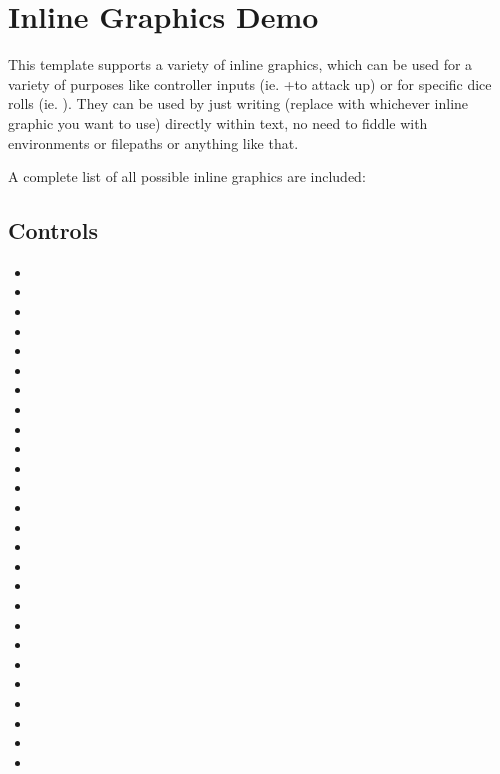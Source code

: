 \section{Inline Graphics Demo}

This template supports a variety of inline graphics, which can be used for a variety of purposes like controller inputs (ie. \controllerA+\controllerJoystickUp to attack up) or for specific dice rolls (ie. \diceSix\diceSix). They can be used by just writing \texttt{\controllerA} (replace with whichever inline graphic you want to use) directly within text, no need to fiddle with environments or filepaths or anything like that.

A complete list of all possible inline graphics are included:

\subsection{Controls}

\newcommand{\glyphdemo}[1]{#1 \hspace{1pt} \texttt{#1}}

\begin{itemize}
	\item \glyphdemo{\controllerA}
	\item \glyphdemo{\controllerB}
	\item \glyphdemo{\controllerX}
	\item \glyphdemo{\controllerY}
	\item \glyphdemo{\controllerDpad}
	\item \glyphdemo{\controllerDpadUp}
	\item \glyphdemo{\controllerDpadLeft}
	\item \glyphdemo{\controllerDpadDown}
	\item \glyphdemo{\controllerDpadRight}
	\item \glyphdemo{\controllerJoystick}
	\item \glyphdemo{\controllerJoystickUp}
	\item \glyphdemo{\controllerJoystickLeft}
	\item \glyphdemo{\controllerJoystickDown}
	\item \glyphdemo{\controllerJoystickRight}
	\item \glyphdemo{\controllerJoystickPress}
	\item \glyphdemo{\controllerL}
	\item \glyphdemo{\controllerLalt}
	\item \glyphdemo{\controllerR}
	\item \glyphdemo{\controllerRalt}
	\item \glyphdemo{\controllerZ}
	\item \glyphdemo{\controllerMouse}
	\item \glyphdemo{\controllerMouseLMB}
	\item \glyphdemo{\controllerMouseRMB}
	\item \glyphdemo{\controllerMouseScroll}
	\item \glyphdemo{\controllerMouseScrollUp}
	\item \glyphdemo{\controllerMouseScrollDown}
\end{itemize}

